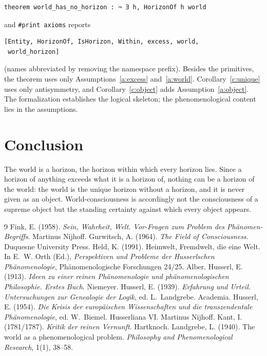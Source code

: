 \documentclass{situationist-preprint}
\begin{document}
\begin{lstlisting}
theorem world_has_no_horizon : ¬ ∃ h, HorizonOf h world
\end{lstlisting}

\noindent and \texttt{\#print axioms} reports

\begin{lstlisting}
[Entity, HorizonOf, IsHorizon, Within, excess, world,
 world_horizon]
\end{lstlisting}

\noindent (names abbreviated by removing the namespace prefix). Besides the primitives, the theorem uses only Assumptions~\ref{a:excess} and~\ref{a:world}. Corollary~\ref{c:unique} uses only antisymmetry, and Corollary~\ref{c:object} adds Assumption~\ref{a:object}. The formalization establishes the logical skeleton; the phenomenological content lies in the assumptions.

\section{Conclusion}

The world is a horizon, the horizon within which every horizon lies. Since a horizon of anything exceeds what it is a horizon of, nothing can be a horizon of the world: the world is the unique horizon without a horizon, and it is never given as an object. World-consciousness is accordingly not the consciousness of a supreme object but the standing certainty against which every object appears.

\begin{thebibliography}{9}\small
{} Fink, E. (1958). \emph{Sein, Wahrheit, Welt. Vor-Fragen zum Problem des Phänomen-Begriffs}. Martinus Nijhoff.
 Gurwitsch, A. (1964). \emph{The Field of Consciousness}. Duquesne University Press.
 Held, K. (1991). Heimwelt, Fremdwelt, die eine Welt. In E.~W. Orth (Ed.), \emph{Perspektiven und Probleme der Husserlschen Phänomenologie}, Phänomenologische Forschungen 24/25. Alber.
 Husserl, E. (1913). \emph{Ideen zu einer reinen Phänomenologie und phänomenologischen Philosophie. Erstes Buch}. Niemeyer.
 Husserl, E. (1939). \emph{Erfahrung und Urteil. Untersuchungen zur Genealogie der Logik}, ed. L.~Landgrebe. Academia.
 Husserl, E. (1954). \emph{Die Krisis der europäischen Wissenschaften und die transzendentale Phänomenologie}, ed. W.~Biemel. Husserliana VI. Martinus Nijhoff.
 Kant, I. (1781/1787). \emph{Kritik der reinen Vernunft}. Hartknoch.
 Landgrebe, L. (1940). The world as a phenomenological problem. \emph{Philosophy and Phenomenological Research}, 1(1), 38--58.
\end{thebibliography}
\end{document}
